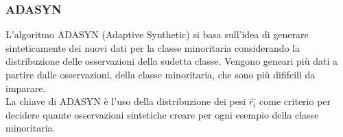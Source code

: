 \documentclass[italian,12pt,a4paper]{article}
\begin{document}
	\begin{figure}[!ht]
		\centering
	\end{figure}
	\subsubsection{ADASYN}
	L'algoritmo ADASYN (Adaptive Synthetic) si basa sull'idea di generare sinteticamente dei nuovi dati per la classe minoritaria considerando la distribuzione delle osservazioni della sudetta classe. Vengono geneari più dati a partire dalle osservazioni, della classe minoritaria, che sono più dififcili da imparare. \\
	La chiave di ADASYN è l'uso della distribuzione dei pesi $\hat{r_i}$ come criterio per decidere quante osservazioni sintetiche creare per ogni esempio della classe minoritaria.
	
\end{document}
